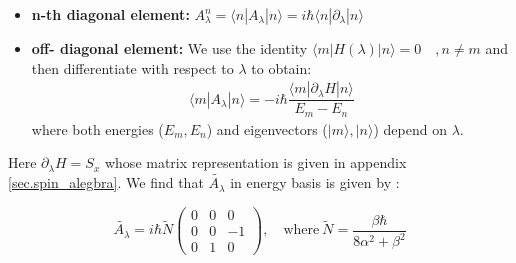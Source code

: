 \documentclass[11pt,a4paper]{article}
\begin{document}
\begin{itemize}
\item \textbf{n-th diagonal element:} $A_{\lambda}^n= \langle n |A_{\lambda} | n \rangle=  i \hbar\langle n |\partial_{\lambda} | n \rangle $

%
%
\item \textbf{off- diagonal element:} We use the identity $\langle m |H(\lambda) | n \rangle=0 \quad, n \neq m$ and then differentiate with respect to $\lambda$ to obtain:
\begin{align}
\langle m |A_{\lambda} | n \rangle =  -i \hbar \dfrac{\langle m |\partial_{\lambda}H | n \rangle}{E_m-E_n}
\end{align}
where both  energies ($E_m, E_n$) and eigenvectors ($|m \rangle, |n \rangle$) depend on $\lambda$.
\end{itemize}


Here $\partial_{\lambda} H=S_x$ whose matrix representation is given in appendix \ref{sec.spin_alegbra}. We find that $\tilde{A_{\lambda}} $ in energy basis is given by :

\begin{equation}
\tilde{A_{\lambda}}=i\hbar \tilde{N}
\begin{pmatrix}
0 & 0 & 0\\
0 & 0 & -1 \\
0 & 1 & 0
\end{pmatrix}, \quad \mbox{where} ~ \tilde{N} =\dfrac{ \beta \hbar}{8 \alpha^{2} + \beta^{2}}
\end{equation}
\end{document}
